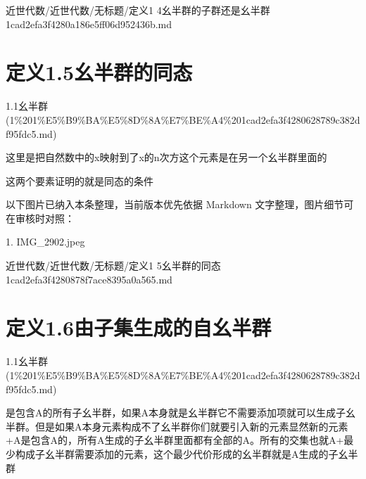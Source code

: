 \begin{note}[来源路径]

近世代数/近世代数/无标题/定义1 4幺半群的子群还是幺半群 1cad2efa3f4280a186e5ff06d952436b.md

\end{note}

\section*{定义1.5幺半群的同态}

\begin{note}[来源上级主题]

1.1幺半群 (1\%201\%E5\%B9\%BA\%E5\%8D\%8A\%E7\%BE\%A4\%201cad2efa3f4280628789c382df95fdc5.md)

\end{note}

\begin{definition}[定义1.5幺半群的同态]

这里是把自然数中的x映射到了x的n次方这个元素是在另一个幺半群里面的

这两个要素证明的就是同态的条件

\end{definition}

\begin{note}[关联图片]
以下图片已纳入本条整理，当前版本优先依据 Markdown 文字整理，图片细节可在审核时对照：

1. IMG\_2902.jpeg\\

\end{note}

\begin{note}[来源路径]

近世代数/近世代数/无标题/定义1 5幺半群的同态 1cad2efa3f4280878f7ace8395a0a565.md

\end{note}

\section*{定义1.6由子集生成的自幺半群}

\begin{note}[来源上级主题]

1.1幺半群 (1\%201\%E5\%B9\%BA\%E5\%8D\%8A\%E7\%BE\%A4\%201cad2efa3f4280628789c382df95fdc5.md)

\end{note}

\begin{definition}[定义1.6由子集生成的自幺半群]

是包含A的所有子幺半群，如果A本身就是幺半群它不需要添加项就可以生成子幺半群。但是如果A本身元素构成不了幺半群你们就要引入新的元素显然新的元素+A是包含A的，所有A生成的子幺半群里面都有全部的A。所有的交集也就A+最少构成子幺半群需要添加的元素，这个最少代价形成的幺半群就是A生成的子幺半群

\end{definition}

